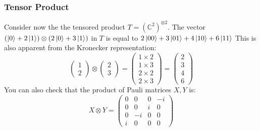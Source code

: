 \documentclass{beamer}
\begin{document}
    \begin{frame}
        \frametitle{Tensor Product}
        \begin{example}
            Consider now the the tensored product $T = (\mathbb{C}^2)^{\otimes 2}$.
            The vector $(\ket{0} + 2 \ket{1}) \otimes (2 \ket{0} + 3 \ket{1})$ in $T$ is equal to $ 2 \ket{00} + 3 \ket{01} + 4\ket{10} + 6\ket{11}$
            This is also apparent from the Kronecker representation:
            \begin{equation}
                \begin{pmatrix}
                    1 \\
                    2
                \end{pmatrix} \otimes
                \begin{pmatrix}
                    2 \\
                    3
                \end{pmatrix}
                = 
                \begin{pmatrix}
                    1 \times 2 \\
                    1 \times 3 \\
                    2 \times 2 \\
                    2 \times 3
                \end{pmatrix}
                = \begin{pmatrix}
                    2 \\
                    3 \\
                    4 \\
                    6
                \end{pmatrix}
            \end{equation}
            You can also check that the product of Pauli matrices $X, Y$ is:
            \begin{equation}
                X \otimes Y = 
                \begin{pmatrix}
                    0 & 0 & 0 & -i \\
                    0 & 0 & i & 0 \\
                    0 & -i & 0 & 0 \\
                    i & 0 & 0 & 0 
                \end{pmatrix}
            \end{equation}
        \end{example}
    \end{frame}
\end{document}

